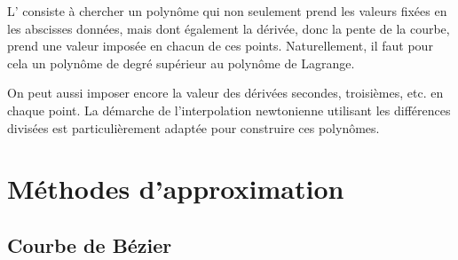 L' consiste à chercher 
un polynôme qui non seulement prend les valeurs  fixées en les 
abscisses données, mais dont également la dérivée, donc la pente de la courbe, 
prend une valeur imposée en chacun de ces points. 
Naturellement, il faut pour cela un polynôme de degré supérieur au polynôme de Lagrange.

On peut aussi imposer encore la valeur des dérivées secondes, troisièmes, etc. en chaque point. 
La démarche de l'interpolation newtonienne 
utilisant les différences divisées est particulièrement adaptée pour construire ces polynômes.






\medskip
\section{Méthodes d'approximation}

\medskip
\subsection{Courbe de Bézier}

